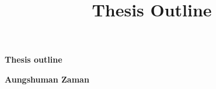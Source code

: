 \documentclass[12pt]{article}
\begin{document}
\title{\bf{Thesis Outline}}

\vspace*{3\baselineskip}
\centerline{\bf{Thesis outline}}

\vspace*{1\baselineskip}
\centerline{\bf{Aungshuman Zaman}}

    

\newpage
{}


%
%
%
\end{document}
